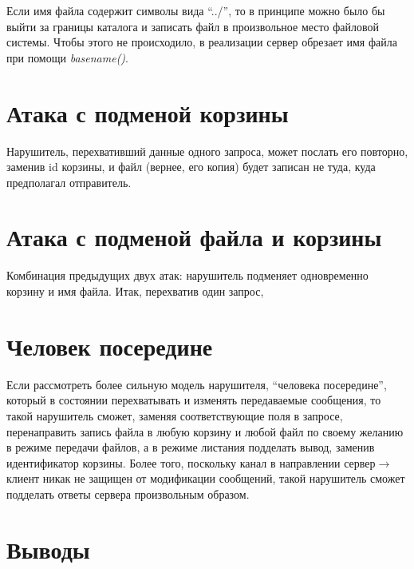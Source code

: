 \documentclass[a4paper,12pt]{article}
\begin{document}
Если имя файла содержит символы вида ``../'', то в принципе можно было бы выйти за границы каталога и записать файл 
в произвольное место файловой системы. Чтобы этого не происходило, в реализации сервер обрезает имя файла при помощи \emph{basename()}.
 
\section{Атака с подменой корзины}

Нарушитель, перехвативший данные одного запроса, может послать его повторно, заменив id корзины, и файл (вернее, его копия) 
будет записан не туда,
куда предполагал отправитель. 

\section{Атака с подменой файла и корзины}

Комбинация предыдущих двух атак: нарушитель подменяет одновременно корзину и имя файла. Итак, перехватив один запрос,

\section{Человек посередине}

Если рассмотреть более сильную модель нарушителя, ``человека посередине'', который в состоянии перехватывать и изменять передаваемые сообщения, то такой нарушитель сможет, заменяя соответствующие поля в запросе, перенаправить запись файла в любую корзину и любой файл
по своему желанию в режиме передачи файлов, а  в режиме листания подделать вывод, заменив идентификатор корзины. Более того,
поскольку канал в направлении сервер$\to$клиент никак не защищен от модификации сообщений, такой нарушитель сможет подделать ответы сервера произвольным образом.

\section*{Выводы}
\end{document}
